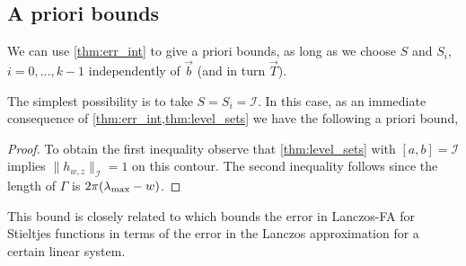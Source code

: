 \subsection{A priori bounds}

We can use \cref{thm:err_int} to give a priori bounds, as long as we choose \( S \) and \( S_i \), \( i = 0, \ldots, k-1 \) independently of $\vec b$ (and in turn $\vec{T}$). %

The simplest possibility is to take \( S = S_i = \mathcal{I} \).
In this case, as an immediate consequence of \cref{thm:err_int,thm:level_sets} we have the following a priori bound,
\begin{proof}
To obtain the first inequality  observe that \cref{thm:level_sets} with \( [a,b] = \mathcal{I} \) implies \( \|h_{w,z}\|_{\mathcal{I}} = 1 \) on this contour.
The second inequality follows since the length of \( \Gamma \) is \( 2 \pi (\lambda_{\textup{max}}-w) \).
\end{proof}
This bound is closely related to \cite[Theorem 6.6]{frommer_guttel_schweitzer_14a} which bounds the error in Lanczos-FA for Stieltjes
functions in terms of the error in the Lanczos approximation for a certain linear system.

